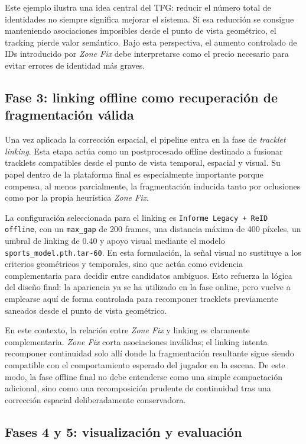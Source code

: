 \documentclass[../MAIN.tex]{subfiles}
\begin{document}
	Este ejemplo ilustra una idea central del TFG: reducir el número total de identidades no siempre significa mejorar el sistema. Si esa reducción se consigue manteniendo asociaciones imposibles desde el punto de vista geométrico, el tracking pierde valor semántico. Bajo esta perspectiva, el aumento controlado de IDs introducido por \textit{Zone Fix} debe interpretarse como el precio necesario para evitar errores de identidad más graves.
	
	\subsection{Fase 3: linking offline como recuperación de fragmentación válida}
	
	Una vez aplicada la corrección espacial, el pipeline entra en la fase de \textit{tracklet linking}. Esta etapa actúa como un postprocesado offline destinado a fusionar tracklets compatibles desde el punto de vista temporal, espacial y visual. Su papel dentro de la plataforma final es especialmente importante porque compensa, al menos parcialmente, la fragmentación inducida tanto por oclusiones como por la propia heurística \textit{Zone Fix}.
	
	La configuración seleccionada para el linking es \texttt{Informe Legacy + ReID offline}, con un \texttt{max\_gap} de 200 frames, una distancia máxima de 400 píxeles, un umbral de linking de 0.40 y apoyo visual mediante el modelo \texttt{sports\_model.pth.tar-60}. En esta formulación, la señal visual no sustituye a los criterios geométricos y temporales, sino que actúa como evidencia complementaria para decidir entre candidatos ambiguos. Esto refuerza la lógica del diseño final: la apariencia ya se ha utilizado en la fase online, pero vuelve a emplearse aquí de forma controlada para recomponer tracklets previamente saneados desde el punto de vista geométrico.
	
	En este contexto, la relación entre \textit{Zone Fix} y linking es claramente complementaria. \textit{Zone Fix} corta asociaciones inválidas; el linking intenta recomponer continuidad solo allí donde la fragmentación resultante sigue siendo compatible con el comportamiento esperado del jugador en la escena. De este modo, la fase offline final no debe entenderse como una simple compactación adicional, sino como una recomposición prudente de continuidad tras una corrección espacial deliberadamente conservadora.
	
	\subsection{Fases 4 y 5: visualización y evaluación}
	
\end{document}
